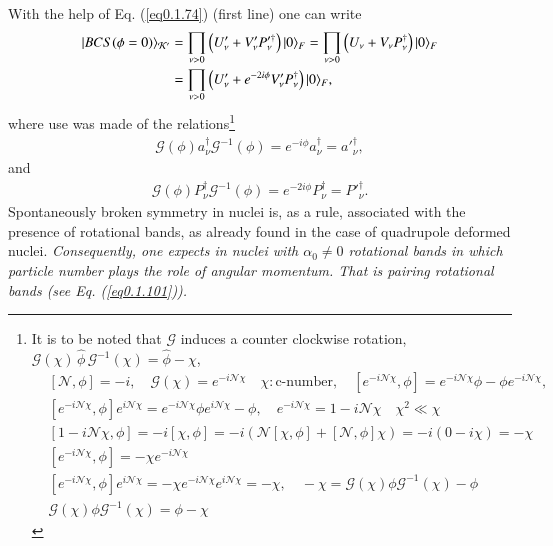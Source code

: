 With the help of Eq. (\ref{eq0.1.74}) (first line) one can write
\begin{align}\label{eq0.1.84}
\nonumber |{BCS(\phi=0)} \rangle_{\mathcal K'}&=\prod_{\nu>0}\left(U'_\nu+V'_\nu P_\nu'^\dagger\right)|{0} \rangle_F=\prod_{\nu>0}\left(U_\nu+V_\nu P^\dagger_\nu\right)|{0} \rangle_F\\
&=\prod_{\nu>0}\left(U'_\nu+e^{-2i\phi}V'_\nu P^\dagger_\nu\right)|{0} \rangle_F,
\end{align}
where use was made of the relations\footnote{It is to be noted that $\mathcal G$ induces a counter clockwise rotation, $\mathcal G(\chi)\,\hat\phi\, \mathcal G^{-1}(\chi)=\hat\phi-\chi$,
	\begin{align*}
	&[\mathcal N,\phi]=-i,\quad\mathcal G(\chi)=e^{-i\mathcal N\chi}\quad \chi:\text{c-number},\quad[e^{-i\mathcal N\chi},\phi]=e^{-i\mathcal N\chi}\phi-\phi e^{-i\mathcal N\chi},\\
	&[e^{-i\mathcal N\chi},\phi]e^{i\mathcal N\chi}=e^{-i\mathcal N\chi}\phi e^{i\mathcal N\chi}-\phi,\quad e^{-i\mathcal N\chi}=1-i\mathcal N\chi\quad \chi^2\ll\chi\\
	&[1-i\mathcal N\chi,\phi]=-i[\mathcal\chi,\phi]=-i\left(\mathcal N[\chi,\phi]+[\mathcal N,\phi]\chi\right)=-i(0-i\chi)=-\chi\\
	&[e^{-i\mathcal N\chi},\phi]=-\chi e^{-i\mathcal N\chi}\\
	&[e^{-i\mathcal N\chi},\phi]e^{i\mathcal N\chi}=-\chi e^{-i\mathcal N\chi}e^{i\mathcal N\chi}=-\chi,\quad -\chi=\mathcal G(\chi)\phi\mathcal G^{-1}(\chi)-\phi\\
	&\mathcal G(\chi)\phi\mathcal G^{-1}(\chi)=\phi-\chi
	\end{align*}
}
\begin{align}\label{eq0.1.85}
\mathcal G(\phi)a^\dagger_\nu \mathcal G^{-1}(\phi)=e^{-i\phi}a^\dagger_\nu=a'^\dagger_\nu,
\end{align}
and 
\begin{align}\label{eq0.1.86}
\mathcal G(\phi)P^\dagger_\nu \mathcal G^{-1}(\phi)=e^{-2i\phi}P^\dagger_\nu=P'^\dagger_\nu.
\end{align}
Spontaneously broken symmetry in nuclei is, as a rule, associated with the presence of rotational bands, as already found in the case of quadrupole deformed nuclei. \textit{Consequently, one expects in nuclei with $\alpha_0\neq0$ rotational bands in which particle number plays the role of angular momentum. That is pairing rotational bands (see Eq. (\ref{eq0.1.101})).}


